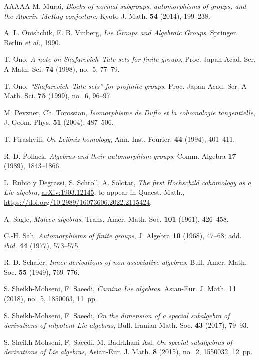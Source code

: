 \documentclass[11pt,reqno]{amsart}
\numberwithin{equation}{section}
\theoremstyle{definition}
\begin{document}
\begin{thebibliography}{AAAAA}
M. Murai,
\emph{Blocks of normal subgroups, automorphisms of groups, and the Alperin--McKay conjecture},
Kyoto J. Math. {\bf 54} (2014), 199--238.

A. L. Onishchik, E. B. Vinberg,
{\it Lie Groups and Algebraic Groups},
Springer, Berlin {\it et al.}, 1990.

T. Ono,
{\emph{A note on Shafarevich--Tate sets for finite groups}},
Proc. Japan Acad. Ser. A Math. Sci. {\bf 74} (1998), no.~5, 77--79.

T. Ono,
{\it ``Shafarevich--Tate sets'' for profinite groups},
Proc. Japan Acad. Ser. A Math. Sci. {\bf 75} (1999), no.~6, 96--97.

M. Pevzner, Ch. Torossian,
{\it Isomorphisme de Duflo et la cohomologie tangentielle},
J. Geom. Phys. {\bf 51} (2004), 487--506.

T. Pirashvili,
\emph{On Leibniz homology},
Ann. Inst. Fourier. {\bf 44} (1994), 401--411.

R. D. Pollack,
{\it Algebras and their automorphism groups},
Comm. Algebra {\bf 17} (1989), 1843--1866.


L. Rubio y Degrassi, S. Schroll, A. Solotar,
{\it The first Hochschild cohomology as a Lie algebra},
\url{arXiv:1903.12145}, to appear in Quaest. Math.,
\url{https://doi.org/10.2989/16073606.2022.2115424}.

A. Sagle,
\emph{Malcev algebras},
Trans. Amer. Math. Soc. {\bf 101} (1961), 426--458.


C.-H. Sah,
\emph{Automorphisms of finite groups},
J. Algebra {\bf 10} (1968), 47--68; add. {\it ibid.}
{\bf 44} (1977), 573--575.

R. D. Schafer,
\emph{Inner derivations of non-associative algebras},
Bull. Amer. Math. Soc. {\bf 55} (1949), 769--776.

S. Sheikh-Mohseni, F. Saeedi,
\emph{Camina Lie algebras},
Asian-Eur. J. Math. {\bf 11} (2018), no.~5, 1850063, 11~pp.

S. Sheikh-Mohseni, F. Saeedi,
\emph{On the dimension of a special subalgebra of derivations
of nilpotent Lie algebras},
Bull. Iranian Math. Soc. {\bf 43} (2017), 79--93.



S. Sheikh-Mohseni, F. Saeedi, M. Badrkhani Asl,
\emph{On special subalgebras of derivations of Lie algebras},
Asian-Eur. J. Math. {\bf 8} (2015), no.~2, 1550032, 12~pp.





\end{thebibliography}
\end{document}
